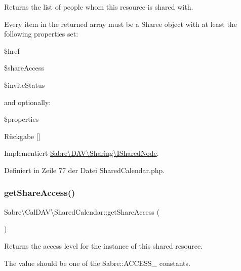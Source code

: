 Returns the list of people whom this resource is shared with.

Every item in the returned array must be a Sharee object with at least the following properties set\+:


\begin{DoxyItemize}
\item \$href
\item \$share\+Access
\item \$invite\+Status
\end{DoxyItemize}

and optionally\+:


\begin{DoxyItemize}
\item \$properties
\end{DoxyItemize}

\begin{DoxyReturn}{Rückgabe}
\mbox{[}\mbox{]} 
\end{DoxyReturn}


Implementiert \mbox{\hyperlink{interface_sabre_1_1_d_a_v_1_1_sharing_1_1_i_shared_node_aa4646ed6e564d50969a4117f0f03eecd}{Sabre\textbackslash{}\+D\+A\+V\textbackslash{}\+Sharing\textbackslash{}\+I\+Shared\+Node}}.



Definiert in Zeile 77 der Datei Shared\+Calendar.\+php.

\mbox{\label{class_sabre_1_1_cal_d_a_v_1_1_shared_calendar_a6a543caf4cf5c259d9a8de538fbd5e11}} 
\subsubsection{\texorpdfstring{get\+Share\+Access()}{getShareAccess()}}
{\footnotesize\ttfamily Sabre\textbackslash{}\+Cal\+D\+A\+V\textbackslash{}\+Shared\+Calendar\+::get\+Share\+Access (\begin{DoxyParamCaption}{ }\end{DoxyParamCaption})}

Returns the \textquotesingle{}access level\textquotesingle{} for the instance of this shared resource.

The value should be one of the Sabre\+::\+A\+C\+C\+E\+S\+S\+\_\+ constants.

